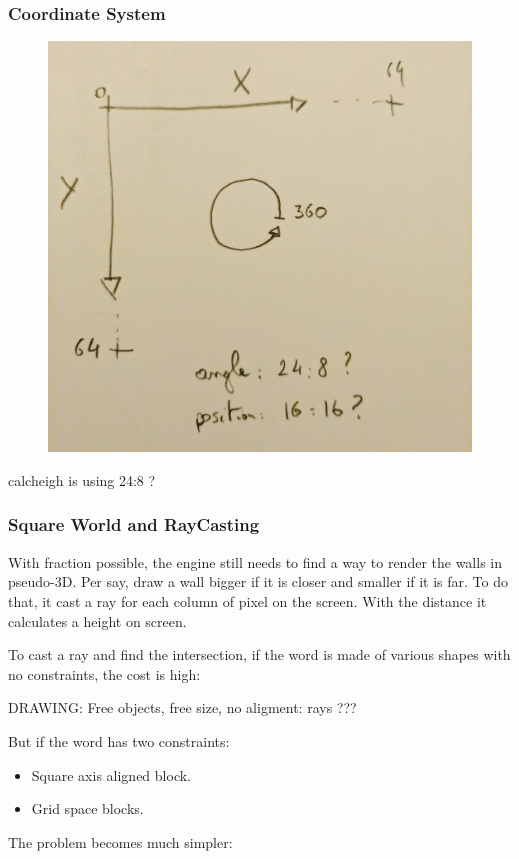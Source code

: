  
 


\subsubsection{Coordinate System}
\par
\begin{figure}[H]
  \centering
 \includegraphics[width=\textwidth]{imgs/coordinate_system.png}
\end{figure}
\par
calcheigh is using 24:8 ?


\subsubsection{Square World and RayCasting}
With fraction possible, the engine still needs to find a way to render the walls in pseudo-3D. Per say, draw a wall bigger if it is closer and smaller if it is far. To do that, it cast a ray for each column of pixel on the screen. With the distance it calculates a height on screen.\\
\par
To cast a ray and find the intersection, if the word is made of various shapes with no constraints, the cost is high:\\
\par
DRAWING: Free objects, free size, no aligment: rays ???\\
\par
But if the word has two constraints:
\begin{itemize}
\item Square axis aligned block.
\item Grid space blocks.
\end{itemize}
\par
The problem becomes much simpler:\\
\par
\begin{figure}[H]
\centering
 
\end{figure}

